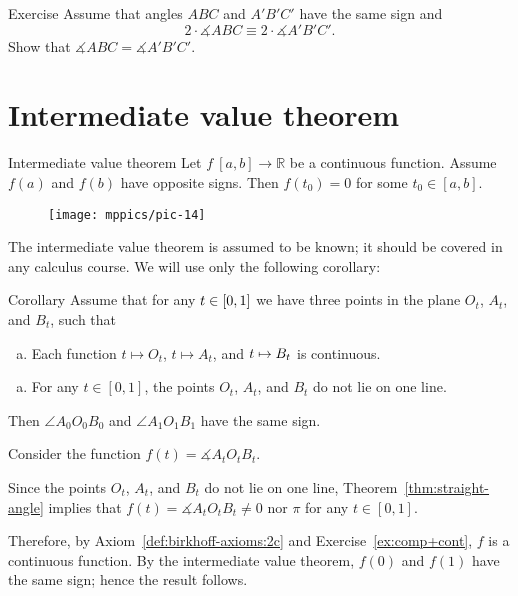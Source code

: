 \begin{thm}{Exercise}\label{ex:PP(PN)}
Assume that angles $ABC$ and $A'B'C'$ have the same sign
and 
\[2\cdot \measuredangle ABC\equiv 2\cdot \measuredangle A'B'C'.\]
Show that $\measuredangle ABC= \measuredangle A'B'C'$.
\end{thm}

\section{Intermediate value theorem}

\begin{thm}{Intermediate value theorem}\label{thm:intermidiate}
Let $f\:[a,b]\to \mathbb{R}$ be a continuous function.
Assume 
$f(a)$ and $f(b)$ have opposite signs.
Then $f(t_0)=0$ for some $t_0\in[a,b]$.
\end{thm}

\begin{wrapfigure}{r}{38mm}
\vskip-6mm
\centering
\texttt{[image: mppics/pic-14]}
\end{wrapfigure}

The intermediate value theorem is assumed to be known;
it should be covered in any calculus course.
We will use only the following corollary:

\begin{thm}[\abs]{Corollary}\label{cor:intermidiate}
Assume that for any $t\in [0,1]$ we have three points in the plane  $O_t$, $A_t$, and $B_t$, such that 
\begin{enumerate}[(a)]
\item Each function $t\mapsto O_t$, $t\mapsto A_t$, and $t\mapsto B_t$ is continuous.
\end{enumerate}

\begin{enumerate}[(a)]\addtocounter{enumi}{1}
\item For any $t\in [0,1]$, the points $O_t$, $A_t$, and $B_t$ do not lie on one line.  
\end{enumerate}
Then $\angle A_0O_0B_0$ and $\angle A_1O_1B_1$ have the same sign.
\end{thm}

Consider the function 
$f(t)=\measuredangle A_tO_tB_t$.

Since 
the points $O_t$, $A_t$, and $B_t$ do not lie on one line,
Theorem~\ref{thm:straight-angle} implies that $f(t)=\measuredangle A_tO_tB_t\ne 0$ nor $\pi$ for any $t\in[0,1]$.

Therefore, by Axiom~\ref{def:birkhoff-axioms:2c} and Exercise~\ref{ex:comp+cont},
$f$ is a continuous function.
By the intermediate value theorem, $f(0)$ and $f(1)$ have the same sign;
hence the result follows.
\qeds


